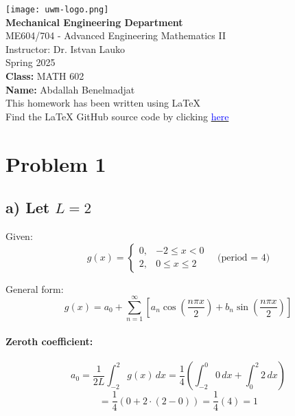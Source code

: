 \documentclass{article}
\date{}
\begin{document}
\begin{titlepage}
    \centering
    \texttt{[image: uwm-logo.png]} \\
    \vspace{1cm}
    {\large \textbf{Mechanical Engineering Department}}\\[0.5em]
    {\large ME604/704 - Advanced Engineering Mathematics II}\\[0.5em]
    {\large Instructor: Dr. Istvan Lauko}\\[0.5em]
    {\large Spring 2025}\\[2cm]
    
    {\large \textbf{Class:} MATH 602}\\[0.5em]
    {\large \textbf{Name:} Abdallah Benelmadjat}\\[0.5em]
    {\large This homework has been written using \LaTeX}\\
    {\large Find the LaTeX GitHub source code by clicking \href{https://github.com/abdallah-benelmadjat/MATH-602/blob/main/HW4.tex}{\textcolor{blue}{here}}}\\

\end{titlepage}

\newpage

\section*{Problem 1}
\subsection*{a) Let $L = 2$}

Given:
\[
g(x) =
\begin{cases}
0, & -2 \le x < 0 \\
2, & 0 \le x \le 2
\end{cases}
\quad \text{(period = 4)}
\]

General form:
\[
g(x) = a_0 + \sum_{n=1}^\infty \left[ a_n \cos\left( \frac{n\pi x}{2} \right) + b_n \sin\left( \frac{n\pi x}{2} \right) \right]
\]

\paragraph{Zeroth coefficient:}
\[
a_0 = \frac{1}{2L} \int_{-2}^{2} g(x)\,dx = \frac{1}{4} \left( \int_{-2}^{0} 0\,dx + \int_0^2 2\,dx \right)
\]
\[
= \frac{1}{4} (0 + 2 \cdot (2 - 0)) = \frac{1}{4}(4) = 1
\]
\end{document}
